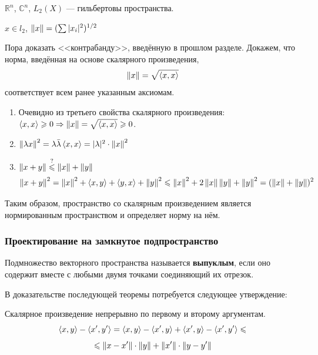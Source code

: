 \documentclass[12pt]{article}
\begin{document}
		\example $\mathbb{R}^n$, $\mathbb{C}^n$, $L_2(X)$ --- гильбертовы пространства.

		\begin{defi}
			$x \in l_2$, $\left\| x \right\| = (\sum{|x_i|^2})^{1/2}$ 
		\end{defi}


		Пора доказать <<контрабанду>>, введённую в прошлом разделе. Докажем, что норма, введённая на основе скалярного произведения, 
		$$\left\| x \right\| = \sqrt{\left\langle x, x \right\rangle}$$
		соответствует всем ранее указанным аксиомам.

		\begin{enumerate}
		\item Очевидно из третьего свойства скалярного произведения: $\left\langle x, x \right\rangle \geqslant 0 \Rightarrow \left\| x \right\| = \sqrt{\left\langle x, x \right\rangle} \geqslant 0$.
		\item $\left\| \lambda x \right\|^2 = \lambda \bar{\lambda} \left\langle x, x \right\rangle = | \lambda |^2 \cdot \left\| x \right\|^2$
		\item $\left\| x+y \right\| \overset{?}{\leqslant} \left\| x \right\| + \left\| y \right\|$
			  $$\left\| x + y \right\|^2 = \left\| x \right\|^2 + \left\langle x, y \right\rangle + \left\langle y, x \right\rangle + \left\| y \right\|^2 \leqslant \left\| x \right\|^2 + 2 \left\| x \right\| \left\| y \right\| + \left\| y \right\|^2
				= (\left\| x \right\| + \left\| y \right\|)^2
			  $$
		\end{enumerate}
		Таким образом, пространство со скалярным произведением является нормированным пространством и определяет норму на нём.

		\subsubsection{Проектирование на замкнутое подпространство}


			\begin{defi}
				Подмножество векторного пространства называется \textbf{выпуклым}, если оно содержит вместе с любыми двумя
				точками соединяющий их отрезок.
			\end{defi}

			В доказательстве последующей теоремы потребуется следующее утверждение:
			\begin{state}
				Скалярное произведение непрерывно по первому и второму аргументам.
				$$\left\langle x, y \right\rangle - \left\langle x', y' \right\rangle = \left\langle x, y \right\rangle - \left\langle x', y \right\rangle + \left\langle x', y \right\rangle - \left\langle x', y' \right\rangle \leqslant$$
				$$\leqslant \left\| x - x' \right\|\cdot \left\| y \right\| + \left\| x' \right\| \cdot \left\| y - y' \right\|$$
			\end{state}
\end{document}
